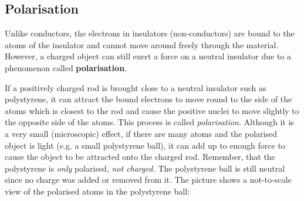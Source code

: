       \subsection*{Polarisation}
            \nopagebreak
            \label{m38780*id201876}Unlike conductors, the electrons in insulators (non-conductors) are bound to the atoms of the
insulator and cannot move around freely through the material. However, a charged object can still
exert a force on a neutral insulator due to a phenomenon called \textbf{polarisation}.\par 
        \label{m38780*id201887}If a positively charged rod is
brought close to a neutral insulator such as polystyrene, it can attract the bound electrons
to move round to the
side of the atoms which is closest to the rod and cause the positive nuclei to move slightly
to the opposite side of the atoms. This process is called \textsl{polarisation}. Although
it is a very small (microscopic) effect, if there are many atoms and the polarised object is
light (e.g. a small polystyrene ball), it can add up to enough force to cause the object to be attracted onto the
charged rod. Remember, that the polystyrene
is \textsl{only} polarised, \textsl{not charged.}
The polystyrene ball is still neutral since no charge was added or removed from it.
The picture shows
a not-to-scale view of the polarised atoms in the polystyrene ball:\par 
        \label{m38780*id201914}
    \setcounter{subfigure}{0}
